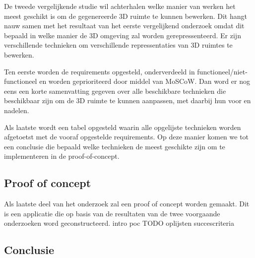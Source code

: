 De tweede vergelijkende studie wil achterhalen welke manier van werken het meest geschikt is om de gegenereerde 3D ruimte te kunnen bewerken. Dit hangt nauw samen met het resultaat van het eerste vergelijkend onderzoek omdat dit bepaald in welke manier de 3D omgeving zal worden gerepressenteerd. Er zijn verschillende technieken om verschillende repressentaties van 3D ruimtes te bewerken.

Ten eerste worden de requirements opgesteld, onderverdeeld in functioneel/niet-functioneel en worden geprioriteerd door middel van MoSCoW.
Dan word er nog eens een korte samenvatting gegeven over alle beschikbare technieken die beschikbaar zijn om de 3D ruimte te kunnen aanpassen, met daarbij hun voor en nadelen.

Als laatste wordt een tabel opgesteld waarin alle opgelijste technieken worden afgetoetst met de vooraf opgestelde requirements. Op deze manier komen we tot een conclusie die bepaald welke technieken de meest geschikte zijn om te implementeren in de proof-of-concept.


\subsection{Proof of concept}

Als laatste deel van het onderzoek zal een proof of concept worden gemaakt. Dit is een applicatie die op basis van de resultaten van de twee voorgaande onderzoeken word geconstructeerd.
intro poc TODO
oplijsten succescriteria

\subsection{Conclusie}